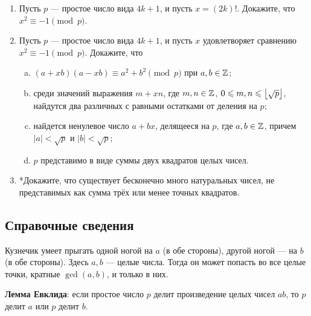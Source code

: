 \begin{enumerate}
\item Пусть $p$ --- простое число вида $4k+1$, и пусть $x=(2k)!$. Докажите, что $x^2\equiv -1\pmod p$.
\item Пусть $p$ --- простое число вида $4k+1$, и пусть $x$ удовлетворяет сравнению $x^2\equiv -1\pmod p$. Докажите, что
\begin{enumerate}[a)]
\item $(a+xb)(a-xb) \equiv a^2+b^2 \pmod p$ при $a,b\in\mathbb Z$;
\item среди значений выражения $m+xn$, где $m,n\in\mathbb Z$, $0\leqslant m,n\leqslant\left\lfloor\sqrt p\right\rfloor$, найдутся два различных с равными остатками от деления на $p$;
\item найдется ненулевое число $a+bx$, делящееся на $p$, где $a,b\in\mathbb Z$, причем $|a|<\sqrt p$ и $|b|<\sqrt p$;
\item $p$ представимо в виде суммы двух квадратов целых чисел.
\end{enumerate}

\item *Докажите, что существует бесконечно много натуральных чисел, не представимых как сумма трёх или менее точных квадратов.

\end{enumerate}

\subsection*{Справочные сведения}

Кузнечик умеет прыгать одной ногой на $a$ (в обе стороны), другой ногой --- на $b$ (в обе стороны). Здесь $a,b$ --- целые числа. Тогда он может попасть во все целые точки, кратные $\gcd(a,b)$, и только в них.

\textbf{Лемма Евклида}: если простое число $p$ делит произведение целых чисел $ab$, то $p$ делит $a$ или $p$ делит $b$.

